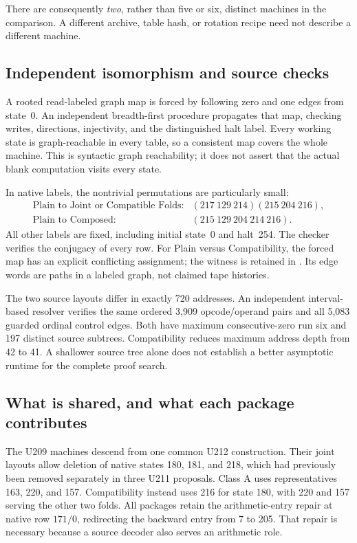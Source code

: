 There are consequently \emph{two}, rather than five or six, distinct
machines in the comparison. A different archive, table hash, or rotation
recipe need not describe a different machine.

\subsection{Independent isomorphism and source checks}
A rooted read-labeled graph map is forced by following zero and one
edges from state~0. An independent breadth-first procedure propagates
that map, checking writes, directions, injectivity, and the distinguished
halt label. Every working state is graph-reachable in every table, so
a consistent map covers the whole machine. This is syntactic graph
reachability; it does not assert that the actual blank computation
visits every state.

In native labels, the nontrivial permutations are particularly small:
\[
\begin{array}{ll}
\text{Plain to Joint or Compatible Folds:}&
 (217\ 129\ 214)(215\ 204\ 216),\\
\text{Plain to Composed:}&(215\ 129\ 204\ 214\ 216).
\end{array}
\]
All other labels are fixed, including initial state~0 and halt~254.
The checker verifies the conjugacy of every row. For Plain versus
Compatibility, the forced map has an explicit conflicting assignment;
the witness is retained in .
Its edge words are paths in a labeled graph, not claimed tape histories.

The two source layouts differ in exactly 720 addresses. An independent
interval-based resolver verifies the same ordered 3,909 opcode/operand
pairs and all 5,083 guarded ordinal control edges. Both have maximum
consecutive-zero run six and 197 distinct source subtrees. Compatibility
reduces maximum address depth from 42 to 41. A shallower source tree alone
does not establish a better asymptotic runtime for the complete proof search.

\subsection{What is shared, and what each package contributes}
The U209 machines descend from one common U212 construction. Their
joint layouts allow deletion of native states 180, 181, and 218, which
had previously been removed separately in three U211 proposals.
Class A uses representatives 163, 220, and 157. Compatibility instead
uses 216 for state 180, with 220 and 157 serving the other two folds.
All packages retain the arithmetic-entry repair at native row $171/0$,
redirecting the backward entry from 7 to 205. That repair is necessary
because a source decoder also serves an arithmetic role.

